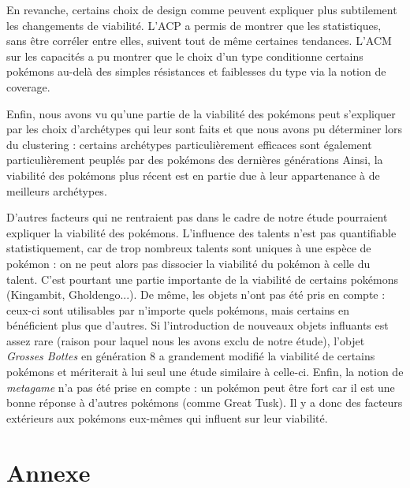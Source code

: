 \documentclass[a4paper,12pt]{article}
\begin{document}
En revanche, certains choix de design comme peuvent expliquer plus subtilement
les changements de viabilité. L'ACP a permis de montrer que les statistiques,
sans être corréler entre elles, suivent tout de même certaines tendances. L'ACM
sur les capacités a pu montrer que le choix d'un type conditionne certains
pokémons au-delà des simples résistances et faiblesses du type via la notion de
coverage.

Enfin, nous avons vu qu'une partie de la viabilité des pokémons peut s'expliquer
par les choix d'archétypes qui leur sont faits et que nous avons pu déterminer
lors du clustering : certains archétypes particulièrement efficaces sont
également particulièrement peuplés par des pokémons des dernières générations
Ainsi, la viabilité des pokémons plus récent est en partie due à leur
appartenance à de meilleurs archétypes.

D'autres facteurs qui ne rentraient pas dans le cadre de notre étude pourraient expliquer la viabilité des pokémons.
L'influence des talents n'est pas quantifiable statistiquement, car de trop nombreux talents
sont uniques à une espèce de pokémon : on ne peut alors pas dissocier la
viabilité du pokémon à celle du talent. C'est pourtant une partie importante de
la viabilité de certains pokémons (Kingambit, Gholdengo...). De même, les objets
n'ont pas été pris en compte : ceux-ci sont utilisables par n'importe quels
pokémons, mais certains en bénéficient plus que d'autres. Si l'introduction de
nouveaux objets influants est assez rare (raison pour laquel nous les avons exclu
de notre étude), l'objet \textit{Grosses Bottes} en génération 8 a grandement
modifié la viabilité de certains pokémons et mériterait à lui seul une étude
similaire à celle-ci. Enfin, la notion de \textit{metagame} n'a pas été prise en compte : un pokémon peut être fort car il est une bonne réponse à d'autres pokémons (comme Great Tusk). Il y a donc des facteurs extérieurs aux pokémons eux-mêmes qui influent sur leur viabilité.
\newpage
\section{Annexe}
\end{document}
